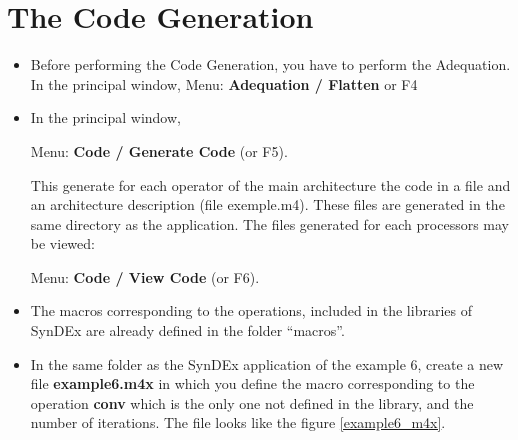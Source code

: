 \documentclass[a4paper,twoside]{report}
\begin{document}
\section{The Code Generation}
\begin{itemize}
\item Before performing the Code Generation, you have to perform the
  Adequation. In the principal window, Menu: \textbf{Adequation / Flatten} or F4

\item In the principal window,

Menu: \textbf{Code / Generate Code} (or F5).

This generate for each operator of the main architecture the code in a
file and an architecture description (file exemple.m4). These files are
generated in the same directory as the application. The files generated for
each processors may be viewed: 

Menu: \textbf{Code / View Code} (or F6). 

\item The macros corresponding to the operations, included in the libraries of
SynDEx are already defined in the folder ``macros''.

\item In the same folder as the SynDEx application of the example 6, create
a new file \textbf{example6.m4x} in which you define the macro corresponding to
the operation
\textbf{conv} which is the only one not defined in the library, and the number of iterations. The file looks like the figure
\ref{example6_m4x}.

\begin{figure}[hbtp]
\end{figure}
\end{itemize}
\end{document}
